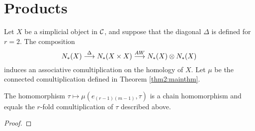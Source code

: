 
\section{Products} \label{s:8products}
Let $X$ be a simplicial object in $\mathcal{C}$, and suppose that the diagonal $\Delta$ is defined for $r=2$. The composition
\[
    N_*(X)\overset{\Delta}{\longrightarrow} N_*(X\times X) \overset{AW}{\longrightarrow} N_*(X)\otimes N_*(X)
\]
induces an associative comultiplication on the homology of $X$. Let $\mu$ be the connected comultiplication defined in Theorem \ref{thm2:mainthm}.
\begin{theorem}
    The homomorphism $\tau\mapsto \mu(e_{(r-1)(m-1)},\tau)$ is a chain homomorphism and equals the $r$-fold comultiplication of $\tau$ described above.
\end{theorem}
\begin{proof}
\end{proof}
